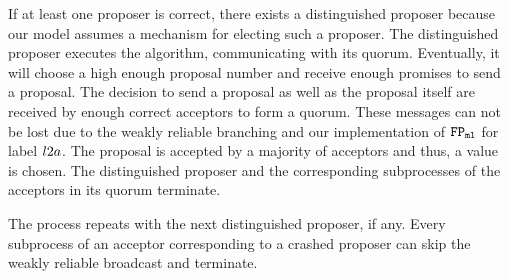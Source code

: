 If at least one proposer is correct, there exists a distinguished proposer because our model assumes a mechanism for electing such a proposer.
The distinguished proposer executes the algorithm, communicating with its quorum.
Eventually, it will choose a high enough proposal number and receive enough promises to send a proposal.
The decision to send a proposal as well as the proposal itself are received by enough correct acceptors to form a quorum.
These messages can not be lost due to the weakly reliable branching and our implementation of $\mathtt{FP_{ml}}$ for label $l2a$.
The proposal is accepted by a majority of acceptors and thus, a value is chosen.
The distinguished proposer and the corresponding subprocesses of the acceptors in its quorum terminate.

The process repeats with the next distinguished proposer, if any.
Every subprocess of an acceptor corresponding to a crashed proposer can skip the weakly reliable broadcast and terminate.
